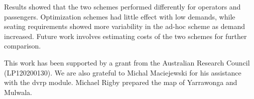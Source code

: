 Results showed that the two schemes performed differently for operators and
passengers. Optimization schemes had little effect with low demands, while
seating requirements showed more variability in the ad-hoc scheme as demand
increased. Future work involves estimating costs of the two schemes for further
comparison.





This work has been supported by a grant from the Australian Research Council
(LP120200130). We are also grateful to Michal Maciejewski for his assistance
with the dvrp module. Michael Rigby prepared the map of Yarrawonga and Mulwala.
